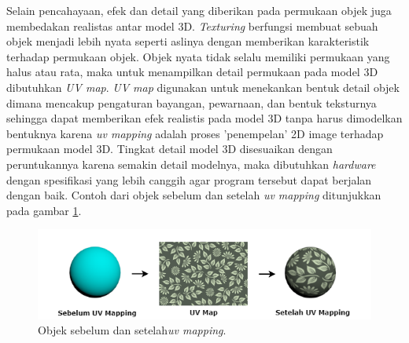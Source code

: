 	Selain pencahayaan, efek dan detail yang diberikan pada permukaan objek juga membedakan realistas antar model 3D. \textit{Texturing} berfungsi membuat sebuah objek menjadi lebih nyata seperti aslinya dengan memberikan karakteristik terhadap permukaan objek. Objek nyata tidak selalu memiliki permukaan yang halus atau rata, maka untuk menampilkan detail permukaan pada model 3D dibutuhkan \textit{UV map}. \textit{UV map} digunakan untuk menekankan bentuk detail objek dimana mencakup pengaturan bayangan, pewarnaan, dan bentuk teksturnya sehingga dapat memberikan efek realistis pada model 3D tanpa harus dimodelkan bentuknya karena \textit{uv mapping} adalah proses 'penempelan' 2D image terhadap permukaan model 3D. Tingkat detail model 3D disesuaikan dengan peruntukannya karena semakin detail modelnya, maka dibutuhkan \textit{hardware} dengan spesifikasi yang lebih canggih agar program tersebut dapat berjalan dengan baik. Contoh dari objek sebelum dan setelah \textit{uv mapping} ditunjukkan pada gambar \ref{fig:model3d_tekstur}.
	\begin{figure} [H]
		\includegraphics[scale=0.5]{img/bab2/model3d_tekstur.png}
		\caption{Objek sebelum dan setelah\textit{uv mapping}\cite{uvmap}.}
		\label{fig:model3d_tekstur}
	\end{figure}
\vspace{2ex}
	
